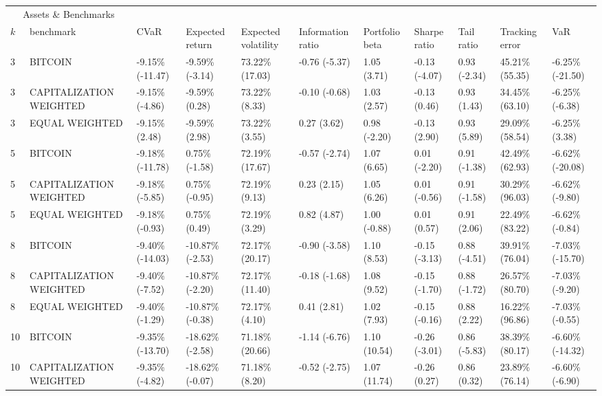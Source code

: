 \documentclass{article}
\begin{document}
\begin{landscape}
\begin{table}[H]
  \centering
  \begin{tabular}{p{0.4cm}|p{3cm}|p{1.65cm}|p{1.65cm}|p{1.65cm}|p{1.65cm}|p{1.65cm}|p{1.65cm}|p{1.65cm}|p{1.65cm}|p{1.65cm}}%
    \toprule
    \multicolumn{2}{c}{Assets \& Benchmarks}                   \\
    \cmidrule(r){1-2}
    $k$ & benchmark & CVaR & Expected return & Expected volatility&Information ratio&Portfolio beta&Sharpe ratio&Tail ratio&Tracking error&VaR\\
    \midrule 
3&BITCOIN&-9.15\% (-11.47)&-9.59\% (-3.14)&73.22\% (17.03)&-0.76 (-5.37)&1.05 (3.71)&-0.13 (-4.07)&0.93 (-2.34)&45.21\% (55.35)&-6.25\% (-21.50)
\\ 
3&CAPITALIZATION WEIGHTED&-9.15\% (-4.86)&-9.59\% (0.28)&73.22\% (8.33)&-0.10 (-0.68)&1.03 (2.57)&-0.13 (0.46)&0.93 (1.43)&34.45\% (63.10)&-6.25\% (-6.38)
\\ 
3&EQUAL WEIGHTED&-9.15\% (2.48)&-9.59\% (2.98)&73.22\% (3.55)&0.27 (3.62)&0.98 (-2.20)&-0.13 (2.90)&0.93 (5.89)&29.09\% (58.54)&-6.25\% (3.38)
\\ 
5&BITCOIN&-9.18\% (-11.78)&0.75\% (-1.58)&72.19\% (17.67)&-0.57 (-2.74)&1.07 (6.65)&0.01 (-2.20)&0.91 (-1.38)&42.49\% (62.93)&-6.62\% (-20.08)
\\ 
5&CAPITALIZATION WEIGHTED&-9.18\% (-5.85)&0.75\% (-0.95)&72.19\% (9.13)&0.23 (2.15)&1.05 (6.26)&0.01 (-0.56)&0.91 (-1.58)&30.29\% (96.03)&-6.62\% (-9.80)
\\ 
5&EQUAL WEIGHTED&-9.18\% (-0.93)&0.75\% (0.49)&72.19\% (3.29)&0.82 (4.87)&1.00 (-0.88)&0.01 (0.57)&0.91 (2.06)&22.49\% (83.22)&-6.62\% (-0.84)
\\ 
8&BITCOIN&-9.40\% (-14.03)&-10.87\% (-2.53)&72.17\% (20.17)&-0.90 (-3.58)&1.10 (8.53)&-0.15 (-3.13)&0.88 (-4.51)&39.91\% (76.04)&-7.03\% (-15.70)
\\ 
8&CAPITALIZATION WEIGHTED&-9.40\% (-7.52)&-10.87\% (-2.20)&72.17\% (11.40)&-0.18 (-1.68)&1.08 (9.52)&-0.15 (-1.70)&0.88 (-1.72)&26.57\% (80.70)&-7.03\% (-9.20)
\\ 
8&EQUAL WEIGHTED&-9.40\% (-1.29)&-10.87\% (-0.38)&72.17\% (4.10)&0.41 (2.81)&1.02 (7.93)&-0.15 (-0.16)&0.88 (2.22)&16.22\% (96.86)&-7.03\% (-0.55)
\\ 
10&BITCOIN&-9.35\% (-13.70)&-18.62\% (-2.58)&71.18\% (20.66)&-1.14 (-6.76)&1.10 (10.54)&-0.26 (-3.01)&0.86 (-5.83)&38.39\% (80.17)&-6.60\% (-14.32)
\\ 
10&CAPITALIZATION WEIGHTED&-9.35\% (-4.82)&-18.62\% (-0.07)&71.18\% (8.20)&-0.52 (-2.75)&1.07 (11.74)&-0.26 (0.27)&0.86 (0.32)&23.89\% (76.14)&-6.60\% (-6.90)

\end{tabular}
\end{table}
\end{landscape}
\end{document}
